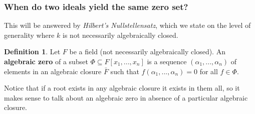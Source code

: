 \documentclass[12pt]{article}
\theoremstyle{plain}
\theoremstyle{definition}
\newtheorem{defn}[thm]{Definition} %
\begin{document}
\subsubsection{When do two ideals yield the same zero set?}
This will be answered by \emph{Hilbert's Nullstellensatz}, which we state on the level of generality where $k$ is not necessarily algebraically closed.
\begin{defn}
\label{def:algzero}
Let $F$ be a field (not necessarily algebraically closed). An \textbf{algebraic zero} of a subset $\Phi \subseteq F[x_1,...,x_n]$ is a sequence $(\alpha_1,...,\alpha_n)$ of elements in an algebraic closure $\bar{F}$ such that $f(\alpha_1,...,\alpha_n) = 0$ for all $f \in \Phi$.
\end{defn}
Notice that if a root exists in any algebraic closure it exists in them all, so it makes sense to talk about an algebraic zero in absence of a particular algebraic closure.
\end{document}
